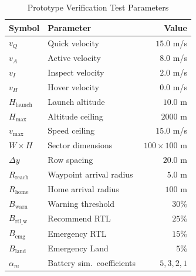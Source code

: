 \begin{table}[t]
\caption{Prototype Verification Test Parameters}
\label{tab:prototype_config}
\centering
\footnotesize
\begin{tabular}{@{}llr@{}}
\toprule
\textbf{Symbol} & \textbf{Parameter} & \textbf{Value} \\
\midrule
$v_Q$ & Quick velocity & $15.0$ m/s \\
$v_A$ & Active velocity & $8.0$ m/s \\
$v_I$ & Inspect velocity & $2.0$ m/s \\
$v_H$ & Hover velocity & $0.0$ m/s \\
$H_{\mathrm{launch}}$ & Launch altitude & $10.0$ m \\
$H_{\max}$ & Altitude ceiling & $2000$ m \\
$v_{\max}$ & Speed ceiling & $15.0$ m/s \\
$W \times H$ & Sector dimensions & $100 \times 100$ m \\
$\Delta y$ & Row spacing & $20.0$ m \\
$R_{\mathrm{reach}}$ & Waypoint arrival radius & $5.0$ m \\
$R_{\mathrm{home}}$ & Home arrival radius & $100$ m \\
\midrule
$B_{\mathrm{warn}}$ & Warning threshold & $30\%$ \\
$B_{\mathrm{rtl\_w}}$ & Recommend RTL & $25\%$ \\
$B_{\mathrm{emg}}$ & Emergency RTL & $15\%$ \\
$B_{\mathrm{land}}$ & Emergency Land & $5\%$ \\
\midrule
$\alpha_m$ & Battery sim.\ coefficients & $5,3,2,1$ \\
\bottomrule
\end{tabular}
\end{table}
